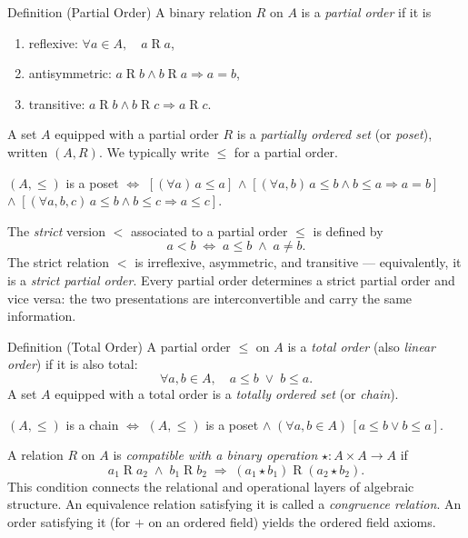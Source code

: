 \begin{definitionbox}{Definition (Partial Order)}
\label{def:partial-order}
A binary relation $R$ on $A$ is a \emph{partial order} if it is
\begin{enumerate}[label=(\roman*)]
  \item reflexive: $\forall a \in A,\quad a \mathrel{R} a$,
  \item antisymmetric: $a \mathrel{R} b \land b \mathrel{R} a \Rightarrow a = b$,
  \item transitive: $a \mathrel{R} b \land b \mathrel{R} c \Rightarrow a \mathrel{R} c$.
\end{enumerate}
A set $A$ equipped with a partial order $R$ is a \emph{partially ordered set}
(or \emph{poset}), written $(A, R)$.
We typically write $\leq$ for a partial order.
\end{definitionbox}

\begin{remark}
$(A, \leq)$ is a poset
$\iff$
$[(\forall a)\, a \leq a]$
$\land\; [(\forall a,b)\, a \leq b \land b \leq a \Rightarrow a = b]$
$\land\; [(\forall a,b,c)\, a \leq b \land b \leq c \Rightarrow a \leq c]$.
\end{remark}

\begin{remark}
\label{def:strict-partial-order}
The \emph{strict} version $<$ associated to a partial order $\leq$ is defined by
\[
  a < b \;\iff\; a \leq b \;\land\; a \neq b.
\]
The strict relation $<$ is irreflexive, asymmetric, and transitive —
equivalently, it is a \emph{strict partial order}.
Every partial order determines a strict partial order and vice versa:
the two presentations are interconvertible and carry the same information.
\end{remark}

\begin{definitionbox}{Definition (Total Order)}
\label{def:total-order}
A partial order $\leq$ on $A$ is a \emph{total order} (also
\emph{linear order}) if it is also total:
\[
  \forall a,b \in A,\quad a \leq b \;\lor\; b \leq a.
\]
A set $A$ equipped with a total order is a \emph{totally ordered set}
(or \emph{chain}).
\end{definitionbox}

\begin{remark}
$(A, \leq)$ is a chain
$\iff$
$(A, \leq)$ is a poset
$\land\; (\forall a,b \in A)\,[a \leq b \lor b \leq a]$.
\end{remark}

\begin{remark}
A relation $R$ on $A$ is \emph{compatible with a binary operation}
$\star : A \times A \to A$ if
\[
  a_1 \mathrel{R} a_2 \;\land\; b_1 \mathrel{R} b_2
  \;\Rightarrow\;
  (a_1 \star b_1) \mathrel{R} (a_2 \star b_2).
\]
This condition connects the relational and operational layers of algebraic
structure.
An equivalence relation satisfying it is called a \emph{congruence relation}.
An order satisfying it (for $+$ on an ordered field) yields the ordered field
axioms.
\end{remark}
